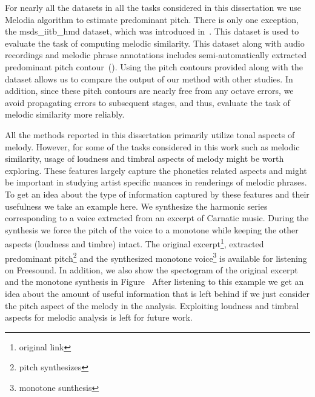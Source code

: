 {For nearly all the datasets in all the tasks considered in this dissertation we use Melodia algorithm to estimate predominant pitch. There is only one exception, the \acrshort{msds_iitb_hmd} dataset, which was introduced in~\cite{Ross2012b}. This dataset is used to evaluate the task of computing melodic similarity. This dataset along with audio recordings and melodic phrase annotations includes semi-automatically extracted predominant pitch contour~(). Using the pitch contours provided along with the dataset allows us to compare the output of our method with other studies. In addition, since these pitch contours are nearly free from any octave errors, we avoid propagating errors to subsequent stages, and thus, evaluate the task of melodic similarity more reliably. 

All the methods reported in this dissertation primarily utilize tonal aspects of melody. However, for some of the tasks considered in this work such as melodic similarity, usage of loudness and timbral aspects of melody might be worth exploring. These features largely capture the phonetics related aspects and might be important in studying artist specific nuances in renderings of melodic phrases. To get an idea about the type of information captured by these features and their usefulness we take an example here. We synthesize the harmonic series corresponding to a voice extracted from an excerpt of Carnatic music. During the synthesis we force the pitch of the voice to a monotone while keeping the other aspects (loudness and timbre) intact. The original excerpt\footnote{original link}, extracted predominant pitch\footnote{pitch synthesizes} and the synthesized monotone voice\footnote{monotone sunthesis} is available for listening on Freesound. In addition, we also show the spectogram of the original excerpt and the monotone synthesis in Figure~ After listening to this example we get an idea about the amount of useful information that is left behind if we just consider the pitch aspect of the melody in the analysis. Exploiting loudness and timbral aspects for melodic analysis is left for future work.

}
